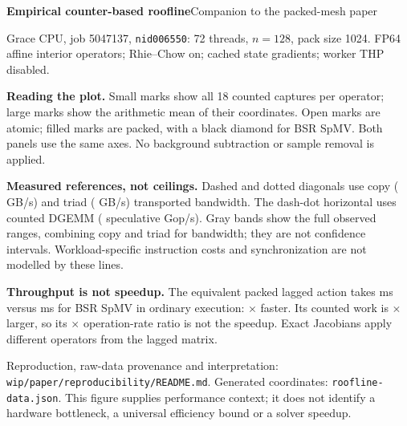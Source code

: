 \documentclass[10pt]{article}
\begin{document}
{\Large\bfseries Empirical counter-based roofline}\hfill Companion to the packed-mesh paper
\par\smallskip
Grace CPU, job 5047137, \texttt{nid006550}: 72 threads, $n=128$, pack size 1024.
FP64 affine interior operators; Rhie--Chow on; cached state gradients; worker THP disabled.
\par\medskip
\begin{minipage}[t]{0.485\textwidth}
  \vspace{0pt}
  
\end{minipage}\hfill
\begin{minipage}[t]{0.485\textwidth}
  \vspace{0pt}
  
\end{minipage}
\par\medskip
\textbf{Reading the plot.} Small marks show all 18 counted captures per operator;
large marks show the arithmetic mean of their coordinates. Open marks are atomic;
filled marks are packed, with a black diamond for BSR SpMV. Both panels use the same axes.
No background subtraction or sample removal is applied.
\par\smallskip
\textbf{Measured references, not ceilings.} Dashed and dotted diagonals use copy
(\rlCompCopy{} GB/s) and triad (\rlCompTriad{} GB/s) transported bandwidth.
The dash-dot horizontal uses counted DGEMM (\rlCompGemm{} speculative Gop/s).
Gray bands show the full observed ranges, combining copy and triad for bandwidth;
they are not confidence intervals. Workload-specific instruction costs and
synchronization are not modelled by these lines.
\par\smallskip
\textbf{Throughput is not speedup.} The equivalent packed lagged action takes
\rlCompLaggedTime{} ms versus \rlCompSpmvTime{} ms for BSR SpMV in ordinary execution:
\rlCompSpeedup{}$\times$ faster. Its counted work is \rlCompWorkRatio{}$\times$ larger,
so its \rlCompRateRatio{}$\times$ operation-rate ratio is not the speedup.
Exact Jacobians apply different operators from the lagged matrix.
\par\smallskip
\footnotesize
Reproduction, raw-data provenance and interpretation:
\texttt{wip/paper/reproducibility/README.md}. Generated coordinates:
\texttt{roofline-data.json}. This figure supplies performance context; it does
not identify a hardware bottleneck, a universal efficiency bound or a solver speedup.
\end{document}

